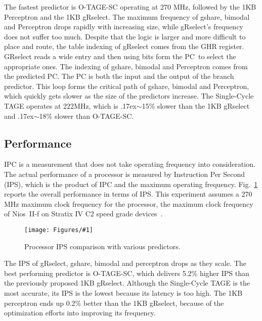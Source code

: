 \documentclass[conference]{IEEEtran}
\newcommand{\mytilde}{{\raise.17ex\hbox{$\scriptstyle\sim$}}}
\newcommand{\kfig}[4]{ %
        \begin{figure}[!t]
        \centering
        \texttt{[image: Figures/\#1]}
        \vspace{-1mm}
        \caption{#3}
        \label{#2}
        \end{figure}
}
\begin{document}
The fastest predictor is \mbox{O-TAGE-SC} operating at 270 MHz, followed by the 1KB Perceptron and the 1KB gRselect. The maximum frequency of gshare, bimodal and Perceptron drops rapidly with increasing size, while gRselect's frequency does not suffer too much. Despite that the logic is larger and more difficult to place and route,  the table indexing of gRselect comes from the GHR register. GRselect reads a wide entry and then using bits form the PC\ to select the appropriate ones. The indexing of gshare, bimodal and Perceptron comes from the predicted PC. The PC is both the input and the output of the branch predictor. This loop forms the critical path of gshare, bimodal and Perceptron, which quickly gets slower as the size of the predictors increase. The Single-Cycle TAGE operates at 222MHz, which is \mytilde15\% slower than the 1KB gRselect and \mytilde 18\% slower than \mbox{O-TAGE-SC}.


\subsection{Performance}
\label{sec:eval:perf}
IPC is a measurement that does not take operating frequency into consideration. The actual performance of a processor is measured by Instruction Per Second (IPS), which is the product of IPC and the maximum operating frequency. Fig.~\ref{fig:adips} reports the overall performance in terms of IPS. This experiment assumes a 270 MHz maximum clock frequency for the processor, the maximum clock frequency of Nios~II-f on Stratix IV C2 speed grade devices~\cite{niosfmax}.
\kfig{adips.pdf}{fig:adips}{Processor IPS comparison with various predictors.}{angle = 0, trim = 0.9in 1.8in 0.7in 1.7in, clip, width=0.5\textwidth}

The IPS of gRselect, gshare, bimodal and perceptron drops as they scale. The best performing predictor is \mbox{O-TAGE-SC}, which delivers 5.2\% higher IPS than the previously proposed 1KB gRselect. Although the Single-Cycle TAGE is the most accurate, its IPS is the lowest because its latency is too high. The 1KB perceptron ends up 0.2\% better than the 1KB gRselect, because of the optimization efforts into improving its frequency. 

\end{document}
